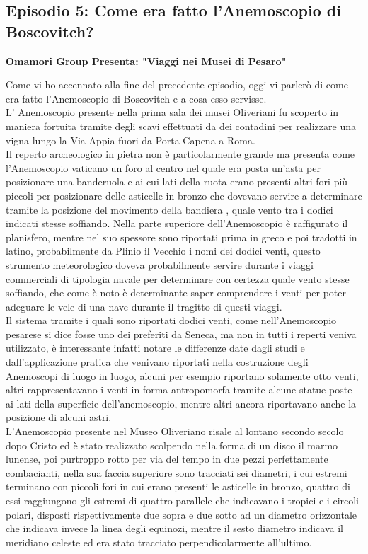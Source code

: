 \documentclass[hidelinks,12pt,a4paper]{article}
\begin{document}
\begin{flushleft}
		\subsection{Episodio 5: Come era fatto l'Anemoscopio di Boscovitch?}
		\begin{center}
			\textbf{Omamori Group Presenta: "Viaggi nei Musei di Pesaro"}
		\end{center}
		Come vi ho accennato alla fine del precedente episodio, oggi vi parlerò di come era fatto l'Anemoscopio di Boscovitch e a cosa esso servisse.\\
		L' Anemoscopio presente nella prima sala dei musei Oliveriani fu scoperto in maniera fortuita tramite degli scavi effettuati da dei contadini per realizzare una vigna lungo la Via Appia fuori da Porta Capena a Roma.\\
		Il reperto archeologico in pietra non è particolarmente grande ma presenta come l'Anemoscopio vaticano un foro al centro nel quale era posta un'asta per posizionare una banderuola e ai cui lati della ruota erano presenti altri fori più piccoli per posizionare delle asticelle in bronzo che dovevano servire a determinare tramite la posizione del movimento della bandiera , quale vento tra i dodici indicati stesse soffiando. Nella parte superiore dell'Anemoscopio è raffigurato il planisfero, mentre nel suo spessore sono riportati prima in greco e poi tradotti in latino, probabilmente da Plinio il Vecchio i nomi dei dodici venti, questo strumento meteorologico doveva probabilmente servire durante i viaggi commerciali di tipologia navale per determinare con certezza quale vento stesse soffiando, che come è noto è determinante saper comprendere i venti per poter adeguare le vele di una nave durante il tragitto di questi viaggi.\\
		Il sistema tramite i quali sono riportati dodici venti, come nell'Anemoscopio pesarese si dice fosse uno dei preferiti da Seneca, ma non in tutti i reperti veniva utilizzato, è interessante infatti notare le differenze date dagli studi e dall'applicazione pratica che venivano riportati nella costruzione degli Anemoscopi di luogo in luogo, alcuni per esempio riportano solamente otto venti, altri rappresentavano i venti in forma antropomorfa tramite alcune statue poste ai lati della superficie dell'anemoscopio, mentre altri ancora riportavano anche la posizione di alcuni astri.\\
		L'Anemoscopio presente nel Museo Oliveriano risale al lontano secondo secolo dopo Cristo ed è stato realizzato scolpendo nella forma di un disco il marmo lunense, poi purtroppo rotto per via del tempo in due pezzi perfettamente combacianti, nella sua faccia superiore sono tracciati sei diametri, i cui estremi terminano con piccoli fori in cui erano presenti le asticelle in bronzo, quattro di essi raggiungono gli estremi di quattro parallele che indicavano i tropici e i circoli polari, disposti rispettivamente due sopra e due sotto ad un diametro orizzontale che indicava invece la linea degli equinozi, mentre il sesto diametro indicava il meridiano celeste ed era stato tracciato perpendicolarmente all'ultimo.\\

\end{flushleft}
\end{document}
